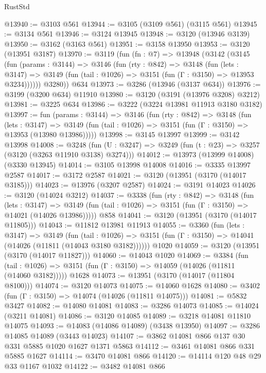 \begin{lexlean}{RustStd}
\begin{coremodule}
{\begin{coremodule}
{{{{{{{{{{{{{{{{{{{{{{{{{{@13940 := @3103 @561
@13944 := @3105 (@3109 @561) (@3115 @561)
@13945 := @3134 @561
@13946 := @3124 @13945
@13948 := @3120 (@13946 @3139)
@13950 := @3162 (@3163 @561)
@13951 := @3158 @13950
@13953 := @3120 (@13951 @3187)
@13970 := @3119
    (fun (fn : @7) =>
    @13948
      (@3142
        (@3145
          (fun (params : @3144) =>
          @3146
            (fun (rty : @842) =>
            @3148
              (fun (lets : @3147) =>
              @3149 (fun (tail : @1026) => @3151 (fun (Γ : @3150) => @13953 @3234))))))
        @3280))
    @634
@13973 := @3286 (@13946 (@3137 @634))
@13976 := @3199 (@3200 @634) @11910
@13980 := @3120 (@3191 (@13976 @3208) @3212)
@13981 := @3225 @634
@13986 := @3222 (@3224 @13981 @11913 @3180 @3182)
@13997 := fun (params : @3144) =>
  @3146
    (fun (rty : @842) =>
    @3148
      (fun (lets : @3147) =>
      @3149 (fun (tail : @1026) => @3151 (fun (Γ : @3150) => @13953 (@13980 @13986)))))
@13998 := @3145 @13997
@13999 := @3142 @13998
@14008 := @3248
    (fun (U : @3247) => @3249 (fun (t : @23) => @3257 (@3120 (@3263 @11910 @3138) @3274)))
@14012 := @13973 (@13999 @14008) (@3330 @13945)
@14014 := @3105 @13998 @14008
@14016 := @3335 @13997 @2587
@14017 := @3172 @2587
@14021 := @3120 (@13951 (@3170 (@14017 @3185)))
@14023 := @13976 (@3207 @2587)
@14024 := @3191 @14023
@14026 := @3120 (@14024 @3212)
@14037 := @3338
    (fun (rty : @842) =>
    @3148
      (fun (lets : @3147) =>
      @3149 (fun (tail : @1026) => @3151 (fun (Γ : @3150) => @14021 (@14026 @13986)))))
    @858
@14041 := @3120 (@13951 (@3170 (@14017 @11805)))
@14043 := @11812 @13981 @11913
@14055 := @3360
    (fun (lets : @3147) =>
    @3149
      (fun (tail : @1026) =>
      @3151 (fun (Γ : @3150) => @14041 (@14026 (@11811 (@14043 @3180 @3182))))))
    @1020
@14059 := @3120 (@13951 (@3170 (@14017 @11827)))
@14060 := @14043 @1020
@14069 := @3384
    (fun (tail : @1026) => @3151 (fun (Γ : @3150) => @14059 (@14026 (@11811 (@14060 @3182)))))
    @1628
@14073 := @13951 (@3170 (@14017 (@11804 @8100)))
@14074 := @3120 @14073
@14075 := @14060 @1628
@14080 := @3402 (fun (Γ : @3150) => @14074 (@14026 (@11811 @14075)))
@14081 := @5832 @3427
@14082 := @14080 @14081
@14083 := @3286 @14073
@14085 := @14024 (@3211 @14081)
@14086 := @3120 @14085
@14089 := @3218 @14081 @11810 @14075
@14093 := @14083 (@14086 @14089) (@3438 @13950)
@14097 := @3286 @14085 @14089 (@3443 @14023)
@14107 := @3862 @14081 @866 @137 @30 @331 @5885 @1020 @1627 @1371 @5863
@14112 := @3461 @14081 @866 @331 @5885 @1627
@14114 := @3470 @14081 @866
@14120 := @14114 @120 @48 @29 @33 @1167 @1032
@14122 := @3482 @14081 @866
}}}}}}}}}}}}}}}}}}}}}}}}}}
\end{coremodule}}
\end{coremodule}
\end{lexlean}
